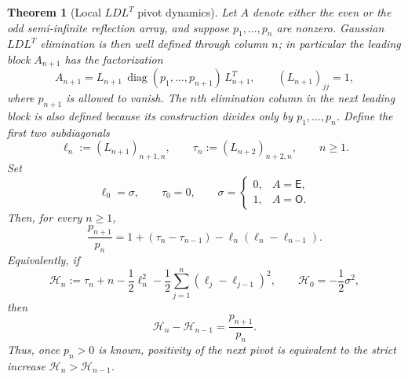 \documentclass[preprint,12pt]{elsarticle}
\numberwithin{equation}{section}
\theoremstyle{plain}
\newtheorem{theorem}{Theorem}[section]
\theoremstyle{definition}
\theoremstyle{remark}
\newcommand{\E}{\mathsf E}
\newcommand{\Omat}{\mathsf O}
\newcommand{\diag}{\operatorname{diag}}
\begin{document}
\begin{theorem}[Local $LDL^T$ pivot dynamics]
\label{thm:local_ldl_pivot_ratio}
Let $A$ denote either the even or the odd semi-infinite reflection array, and suppose
$p_1,\dots,p_n$ are nonzero.  Gaussian $LDL^T$ elimination is then well defined through
column $n$; in particular the leading block $A_{n+1}$ has the factorization
\begin{equation}
 A_{n+1}=L_{n+1}\,\diag(p_1,\dots,p_{n+1})\,L_{n+1}^T,
 \qquad (L_{n+1})_{jj}=1,
 \label{eq:local_LDL_factor}
\end{equation}
where $p_{n+1}$ is allowed to vanish.  The $n$th elimination column in the next
leading block is also defined because its construction divides only by
$p_1,\dots,p_n$.  Define the first two subdiagonals
\begin{equation}
 \ell_n:=(L_{n+1})_{n+1,n},
 \qquad
 \tau_n:=(L_{n+2})_{n+2,n},
 \qquad n\ge1.
 \label{eq:ell_tau_def}
\end{equation}
Set
\begin{equation}
 \ell_0=\sigma,
 \qquad \tau_0=0,
 \qquad
 \sigma=\begin{cases}0,&A=\E,\\1,&A=\Omat.\end{cases}
 \label{eq:ell_tau_boundary}
\end{equation}
Then, for every $n\ge1$,
\begin{equation}
 \boxed{\;
 \frac{p_{n+1}}{p_n}
 =1+(\tau_n-\tau_{n-1})
 -\ell_n(\ell_n-\ell_{n-1}).\;}
 \label{eq:local_pivot_ratio}
\end{equation}
Equivalently, if
\begin{equation}
 \mathcal H_n:=\tau_n+n-\frac12\ell_n^2
 -\frac12\sum_{j=1}^{n}(\ell_j-\ell_{j-1})^2,
 \qquad \mathcal H_0=-\frac12\sigma^2,
 \label{eq:Hlocal_def}
\end{equation}
then
\begin{equation}
 \boxed{\;\mathcal H_n-\mathcal H_{n-1}=\frac{p_{n+1}}{p_n}.\;}
 \label{eq:Hlocal_increment}
\end{equation}
Thus, once $p_n>0$ is known, positivity of the next pivot is equivalent to the strict
increase $\mathcal H_n>\mathcal H_{n-1}$.
\end{theorem}
\end{document}
